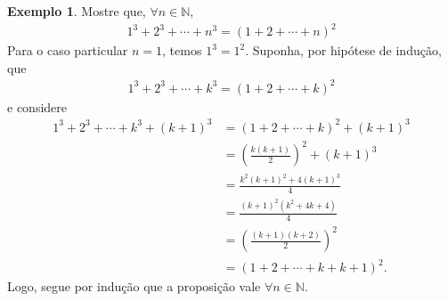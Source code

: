 \documentclass[a4paper,11pt,twoside, leqno]{article}
\theoremstyle{definition}
\newtheorem*{example}{Exemplo}
\begin{document}
\begin{example}
	Mostre que, $\forall n\in\mathbb{N}$, 
	\begin{align*}
	1^3 + 2^3 + \cdots + n^3 = (1 + 2 + \cdots + n)^2
	\end{align*}
	Para o caso particular $n=1$, temos $1^3 = 1^2$. Suponha, por hipótese de indução, que
	\begin{align*}
	1^3 + 2^3 + \cdots + k^3 = (1 + 2 + \cdots + k)^2
	\end{align*}
	e considere
	\begin{align*}
	1^3 + 2^3 + \cdots + k^3 + (k+1)^3 &= (1 + 2 + \cdots + k)^2 + (k+1)^3 \\
	&= \left( \frac{k(k+1)}{2} \right)^2 + (k+1)^3 \\
	&= \frac{ k^2(k+1)^2 + 4(k+1)^3 }{4} \\
	&= \frac{(k+1)^2(k^2 + 4k + 4)}{4} \\
	&= \left( \frac{(k+1)(k+2)}{2} \right)^2 \\
	&= (1 + 2 + \cdots + k + k+1)^2.
	\end{align*}
	Logo, segue por indução que a proposição vale $\forall n\in\mathbb{N}$. 
\end{example}
\end{document}
